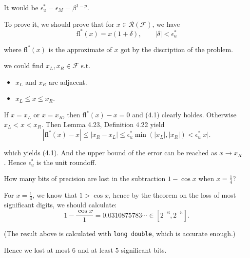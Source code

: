 \documentclass[11pt]{elegantbook}
\begin{document}
\begin{solution}
  It would be $\epsilon_u^*=\epsilon_M=\beta^{1-p}$.
  
  To prove it, we should prove that for $x\in\mathcal{R(F)}$, we have
  \begin{equation}
    \text{fl}^*(x)=x(1+\delta), \qquad |\delta|<\epsilon_u^*
  \end{equation}

  where $\text{fl}^*(x)$ is the approximate of $x$ got by the discription of the problem.

  we could find $x_L,x_R\in\mathcal{F}$ s.t.

  \begin{itemize}
    \item $x_L$ and $x_R$ are adjacent.
    \item $x_L\leq x\leq x_R$.
  \end{itemize}

  If $x=x_L$ or $x=x_R$, then $\text{fl}^*(x)-x=0$ and (4.1) clearly holdes. Otherwise $x_L<x<x_R$. Then Lemma 4.23, Definition 4.22 yield
  \begin{equation*}
    |\text{fl}^*(x)-x|\leq |x_R-x_L|\leq \epsilon_u^*\min(|x_L|,|x_R|)< \epsilon_u^*|x|.
  \end{equation*}

  which yields (4.1). And the upper bound of the error can be reached as $x\to x_{R-}$. Hence $\epsilon_u^*$ is the unit roundoff.
\end{solution}

\vspace{1em}

\begin{problem}
  How many bits of precision are lost in the subtraction $1-\cos x$ when $x=\frac{1}{4}$?
\end{problem}

\begin{solution}
  For $x=\frac{1}{4}$, we know that $1>\cos x$, hence by the theorem on the loss of most significant digits, we should calculate:
  \begin{equation*}
    1-\frac{\cos x}{1}=0.0310875783\cdots \in [2^{-6},2^{-5}].
  \end{equation*}
  
  (The result above is calculated with \verb|long double|, which is accurate enough.)

  Hence we lost at most $6$ and at least $5$ significant bits.
\end{solution}
\end{document}
